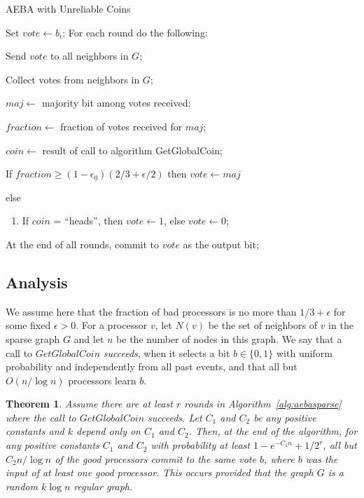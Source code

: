 \documentclass[letterpaper,11pt]{article}
\newtheorem{theorem}{Theorem}
\begin{document}
\begin{algorithm}
\caption{AEBA with Unreliable Coins} \label{alg:aebasparse}
Set $vote \leftarrow b_{i}$; For each round do the following:
\begin{enumerate*}
\item Send $vote$ to all neighbors in $G$;
      \label {step_a}
\item Collect votes from neighbors in $G$;
      \label {step_b}
\item $maj \leftarrow$ majority bit among votes received;
\item $fraction \leftarrow$ fraction of votes received for $maj$;
\item $coin \leftarrow$ result of call to algorithm GetGlobalCoin;
\item If $fraction \geq (1-\epsilon_{0}) (2/3 + \epsilon/2)$ then $vote \leftarrow maj$
\item else
\begin{enumerate}
\item If $coin$ = ``heads'', then $vote \leftarrow 1$, else $vote \leftarrow 0$;
\end{enumerate}
\end{enumerate*}

At the end of all rounds, commit to $vote$ as the output bit;
\end{algorithm}

\subsection{Analysis}

We assume here that the fraction of bad processors is no more than $1/3 + \epsilon$ for some fixed $\epsilon > 0$.  For a processor $v$, let $N(v)$ be the set of neighbors of $v$ in the sparse graph $G$ and let $n$ be the number of nodes in this graph.  We say that a call to $GetGlobalCoin$ \emph{succeeds}, when it selects a bit $b \in \{0,1\}$ with uniform probability and independently from all past events, and that all but $O(n/ \log n)$ processors learn $b$.

\begin{theorem} Assume there are at least $r$ rounds in Algorithm~\ref{alg:aebasparse} where the call to $GetGlobalCoin$ succeeds.  Let $C_{1}$ and $C_{2}$ be any positive constants and $k$ depend only on $C_{1}$ and $C_{2}$.  Then, at the end of the algorithm, for any positive constants $C_{1}$ and $C_{2}$ with probability at least $1-e^{-C_{1}n} + 1/2^{r}$, all but $C_{2}n / \log n$ of the good processors commit to the same vote $b$, where $b$ was the input of at least one good processor.   This occurs provided that the graph $G$ is a random $k \log n$ regular graph.
\end{theorem}
\end{document}
